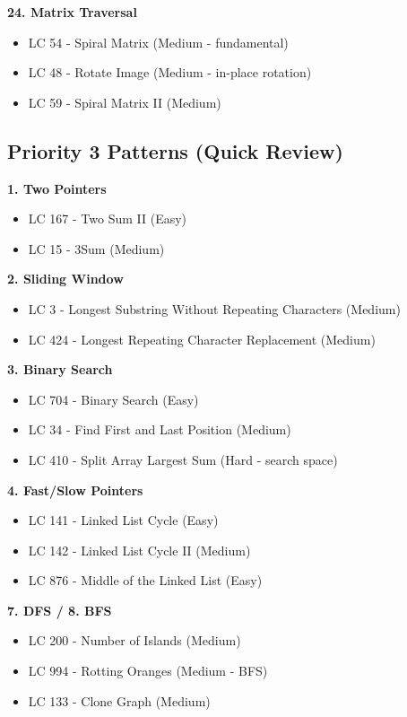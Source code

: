 \documentclass[10pt]{article}
\begin{document}
\textbf{24. Matrix Traversal}
\begin{itemize}
\item LC 54 - Spiral Matrix (Medium - fundamental)
\item LC 48 - Rotate Image (Medium - in-place rotation)
\item LC 59 - Spiral Matrix II (Medium)
\end{itemize}

\subsection{Priority 3 Patterns (Quick Review)}

\textbf{1. Two Pointers}
\begin{itemize}
\item LC 167 - Two Sum II (Easy)
\item LC 15 - 3Sum (Medium)
\end{itemize}

\textbf{2. Sliding Window}
\begin{itemize}
\item LC 3 - Longest Substring Without Repeating Characters (Medium)
\item LC 424 - Longest Repeating Character Replacement (Medium)
\end{itemize}

\textbf{3. Binary Search}
\begin{itemize}
\item LC 704 - Binary Search (Easy)
\item LC 34 - Find First and Last Position (Medium)
\item LC 410 - Split Array Largest Sum (Hard - search space)
\end{itemize}

\textbf{4. Fast/Slow Pointers}
\begin{itemize}
\item LC 141 - Linked List Cycle (Easy)
\item LC 142 - Linked List Cycle II (Medium)
\item LC 876 - Middle of the Linked List (Easy)
\end{itemize}

\textbf{7. DFS / 8. BFS}
\begin{itemize}
\item LC 200 - Number of Islands (Medium)
\item LC 994 - Rotting Oranges (Medium - BFS)
\item LC 133 - Clone Graph (Medium)
\end{itemize}
\end{document}
